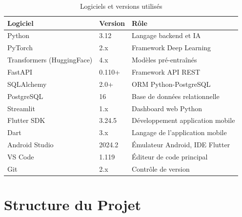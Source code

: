 \begin{table}[H]
\centering
\caption{Logiciels et versions utilisés}
\label{tab:software}
\renewcommand{\arraystretch}{1.4}
\begin{tabular}{lll}
\toprule
\rowcolor{bleuprincipal!15}
\textbf{Logiciel} & \textbf{Version} & \textbf{Rôle} \\
\midrule
Python & 3.12 & Langage backend et IA \\
\rowcolor{gray!8}
PyTorch & 2.x & Framework Deep Learning \\
Transformers (HuggingFace) & 4.x & Modèles pré-entraînés \\
\rowcolor{gray!8}
FastAPI & 0.110+ & Framework API REST \\
SQLAlchemy & 2.0+ & ORM Python-PostgreSQL \\
\rowcolor{gray!8}
PostgreSQL & 16 & Base de données relationnelle \\
Streamlit & 1.x & Dashboard web Python \\
\rowcolor{gray!8}
Flutter SDK & 3.24.5 & Développement application mobile \\
Dart & 3.x & Langage de l'application mobile \\
\rowcolor{gray!8}
Android Studio & 2024.2 & Émulateur Android, IDE Flutter \\
VS Code & 1.119 & Éditeur de code principal \\
\rowcolor{gray!8}
Git & 2.x & Contrôle de version \\
\bottomrule
\end{tabular}
\end{table}

\section{Structure du Projet}

